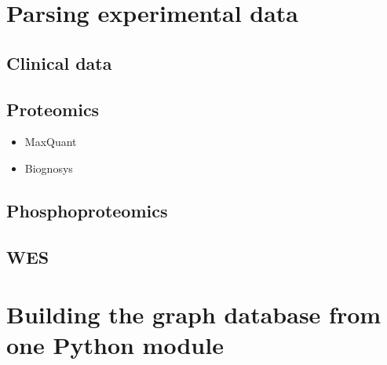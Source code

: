 \documentclass[letterpaper,10pt,english]{sphinxmanual}
\begin{document}
\section{Parsing experimental data}
\label{\detokenize{ckg_builder/experiments:parsing-experimental-data}}\label{\detokenize{ckg_builder/experiments::doc}}

\subsection{Clinical data}
\label{\detokenize{ckg_builder/experiments:clinical-data}}

\subsection{Proteomics}
\label{\detokenize{ckg_builder/experiments:proteomics}}\begin{itemize}
\item {} 
MaxQuant

\item {} 
Biognosys

\end{itemize}


\subsection{Phosphoproteomics}
\label{\detokenize{ckg_builder/experiments:phosphoproteomics}}

\subsection{WES}
\label{\detokenize{ckg_builder/experiments:wes}}

\section{Building the graph database from one Python module}
\label{\detokenize{ckg_builder/graphdb-builder:building-the-graph-database-from-one-python-module}}\label{\detokenize{ckg_builder/graphdb-builder::doc}}
\end{document}
